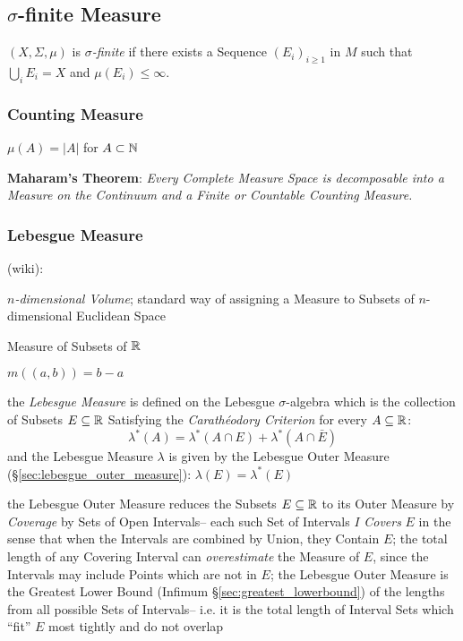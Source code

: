 \subsection{$\sigma$-finite Measure}\label{sec:sigma_finite}

$(X,\Sigma,\mu)$ is \emph{$\sigma$-finite} if there exists a Sequence
$(E_i)_{i \geq 1}$ in $M$ such that $\bigcup_{i} E_i = X$ and
$\mu(E_i) \leq \infty$.



\subsubsection{Counting Measure}\label{sec:counting_measure}

$\mu(A) = |A|$ for $A \subset \mathbb{N}$

\textbf{Maharam's Theorem}: \emph{
  Every Complete Measure Space is decomposable into a Measure on the Continuum
  and a Finite or Countable Counting Measure.
}



\subsubsection{Lebesgue Measure}\label{sec:lebesgue_measure}

(wiki):

\emph{$n$-dimensional Volume}; standard way of assigning a Measure to Subsets of
$n$-dimensional Euclidean Space

Measure of Subsets of $\mathbb{R}$

$m((a,b)) = b - a$

the \emph{Lebesgue Measure} is defined on the Lebesgue $\sigma$-algebra which is
the collection of Subsets $E \subseteq \mathbb{R}$ Satisfying the
\emph{Carath\'eodory Criterion} for every $A \subseteq \mathbb{R}$:
\[
  \lambda^*(A) = \lambda^*(A \cap E) + \lambda^*(A \cap \bar{E})
\]
and the Lebesgue Measure $\lambda$ is given by the Lebesgue Outer Measure
(\S\ref{sec:lebesgue_outer_measure}): $\lambda(E) = \lambda^*(E)$

the Lebesgue Outer Measure reduces the Subsets $E \subseteq \mathbb{R}$ to its Outer
Measure by \emph{Coverage} by Sets of Open Intervals-- each such Set of
Intervals $I$ \emph{Covers} $E$ in the sense that when the Intervals are
combined by Union, they Contain $E$; the total length of any Covering Interval
can \emph{overestimate} the Measure of $E$, since the Intervals may include
Points which are not in $E$; the Lebesgue Outer Measure is the Greatest Lower
Bound (Infimum \S\ref{sec:greatest_lowerbound}) of the lengths from all possible
Sets of Intervals-- i.e. it is the total length of Interval Sets which ``fit''
$E$ most tightly and do not overlap

